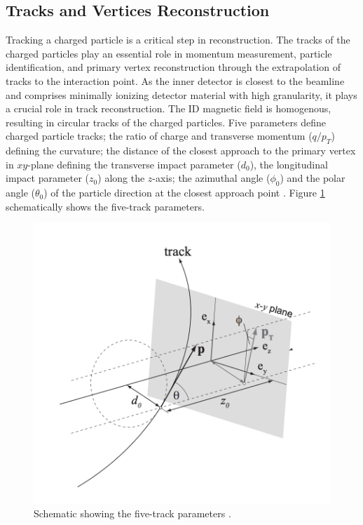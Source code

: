 \subsection{Tracks and Vertices Reconstruction}
\label{subsec:Tracking}
Tracking a charged particle is a critical step in reconstruction. The tracks of the charged particles play an essential role in momentum measurement, particle identification, and primary vertex reconstruction through the extrapolation of tracks to the interaction point. As the inner detector is closest to the beamline and comprises minimally ionizing detector material with high granularity, it plays a crucial role in track reconstruction. The ID magnetic field is homogenous, resulting in circular tracks of the charged particles. Five parameters define charged particle tracks; the ratio of charge and transverse momentum ($q/p_{T}$) defining the curvature; the distance of the closest approach to the primary vertex in $xy$-plane defining the transverse impact parameter ($d_{0}$), the longitudinal impact parameter ($z_{0}$) along the $z$-axis; the azimuthal angle ($\phi_{0}$) and the polar angle ($\theta_{0}$) of the particle direction at the closest approach point \cite{TrackingRun2_ATLAS}. Figure \ref{fig:TrackParameter} schematically shows the five-track parameters. 

\begin{figure}
    \centering
    \includegraphics[width=.98\linewidth]{figures/LHC/TrackParameters.png}
    \caption{ Schematic showing the five-track parameters \cite{TrackParameterFig}.\label{fig:TrackParameter}}
\end{figure}


